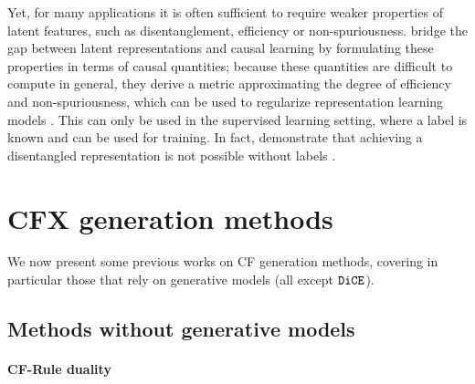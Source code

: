 \documentclass[../main.tex]{subfiles}
\begin{document}
Yet, for many applications it is often sufficient to require weaker properties of latent features, such as disentanglement, efficiency or non-spuriousness.
\citeauthor{wangRepresentation2022} bridge the gap between latent representations and causal learning by formulating these properties in terms of causal quantities; because these quantities are difficult to compute in general, they derive a metric approximating the degree of efficiency and non-spuriousness, which can be used to regularize representation learning models \cite{wangRepresentation2022}.
This can only be used in the supervised learning setting, where a label is known and can be used for training.
In fact, \citeauthor{locatelloChallenging2019} demonstrate that achieving a disentangled representation is not possible without labels \cite{locatelloChallenging2019}.

\section{CFX generation methods}

We now present some previous works on CF generation methods, covering in particular those that rely on generative models (all except $\texttt{DiCE}$).




\subsection{Methods without generative models}

\paragraph{CF-Rule duality}
\end{document}
